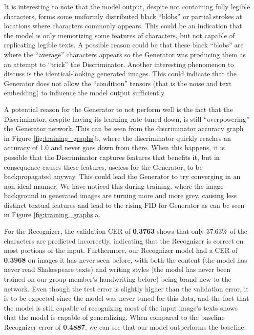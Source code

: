 \documentclass{article} %
\begin{document}
It is interesting to note that the model output, despite not containing fully legible characters, forms some uniformly distributed black ``blobs'' or partial strokes at locations where characters commonly appears. This could be an indication that the model is only memorizing some features of characters, but not capable of replicating legible texts. A possible reason could be that these black ``blobs'' are where the ``average'' characters appears so the Generator was producing them as an attempt to ``trick'' the Discriminator. Another interesting phenomenon to discuss is the identical-looking generated images. This could indicate that the Generator does not allow the ``condition'' tensors (that is the noise and text embedding) to influence the model output sufficiently.

A potential reason for the Generator to not perform well is the fact that the Discriminator, despite having its learning rate tuned down, is still ``overpowering'' the Generator network. This can be seen from the discriminator accuracy graph in Figure \ref{fig:training_graphs}b, where the discriminator quickly reaches an accuracy of 1.0 and never goes down from there. When this happens, it is possible that the Discriminator captures features that benefits it, but in consequence causes these features, useless for the Generator, to be backpropagated anyway. This could lead the Generator to try converging in an non-ideal manner. We have noticed this during training, where the image background in generated images are turning more and more grey, causing less distinct textual features and lead to the rising FID for Generator as can be seen in Figure \ref{fig:training_graphs}a.

For the Recognizer, the validation CER of \textbf{0.3763} shows that only 37.63\% of the characters are predicted incorrectly, indicating that the Recognizer is correct on most portions of the input. Furthermore, our Recognizer model had a CER of \textbf{0.3968} on images it has never seen before, with both the content (the model has never read Shakespeare texts) and writing styles (the model has never been trained on our group member's handwriting before) being brand-new to the network. Even though the test error is slightly higher than the validation error, it is to be expected since the model was never tuned for this data, and the fact that the model is still capable of recognizing most of the input image's texts shows that the model is capable of generalizing. When compared to the baseline Recognizer error of \textbf{0.4887}, we can see that our model outperforms the baseline.
\end{document}
